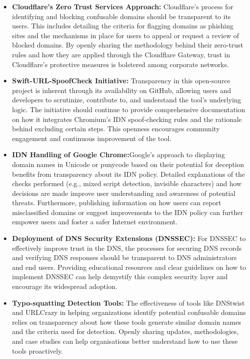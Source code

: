 \begin{itemize}
  \item \textbf{Cloudflare's Zero Trust Services Approach: } Cloudflare's process for identifying and blocking confusable domains should be transparent to its users. This includes detailing the criteria for flagging domains as phishing sites and the mechanisms in place for users to appeal or request a review of blocked domains. By openly sharing the methodology behind their zero-trust rules and how they are applied through the Cloudflare Gateway, trust in Cloudflare's protective measures is bolstered among corporate networks.
  
  \item \textbf{Swift-URL-SpoofCheck Initiative:} Transparency in this open-source project is inherent through its availability on GitHub, allowing users and developers to scrutinize, contribute to, and understand the tool's underlying logic. The initiative should continue to provide comprehensive documentation on how it integrates Chromium's IDN spoof-checking rules and the rationale behind excluding certain steps. This openness encourages community engagement and continuous improvement of the tool.
  
  \item \textbf{IDN Handling of Google Chrome:}Google's approach to displaying domain names in Unicode or punycode based on their potential for deception benefits from transparency about its IDN policy. Detailed explanations of the checks performed (e.g., mixed script detection, invisible characters) and how decisions are made improve user understanding and awareness of potential threats. Furthermore, publishing information on how users can report misclassified domains or suggest improvements to the IDN policy can further empower users and foster a safer Internet environment.
  
  \item \textbf{Deployment of DNS Security Extensions (DNSSEC): }For DNSSEC to effectively improve trust in the DNS, the processes for securing DNS records and verifying DNS responses should be transparent to DNS administrators and end users. Providing educational resources and clear guidelines on how to implement DNSSEC can help demystify this complex security layer and encourage its widespread adoption.
  
  \item \textbf{Typo-squatting Detection Tools: }The effectiveness of tools like DNStwist and URLCrazy in helping organizations identify potential confusable domains relies on transparency about how these tools generate similar domain names and the criteria used for detection. Openly sharing updates, methodologies, and case studies can help organisations better understand how to use these tools proactively.
  

\end{itemize}
